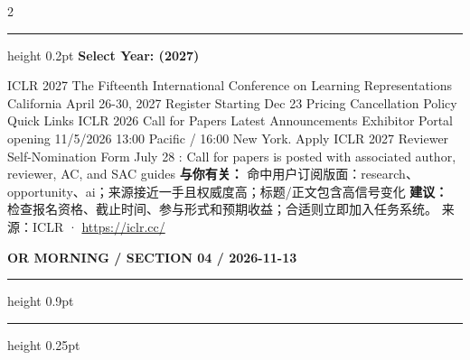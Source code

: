 \documentclass[10.5pt]{ctexart}
\begin{document}
\begin{multicols}{2}
\vspace{2mm}
\hrule height 0.2pt
\vspace{2mm}
{\large\bfseries Select Year: (2027)}\par
ICLR 2027 The Fifteenth International Conference on Learning Representations California April 26-30, 2027 Register Starting Dec 23 Pricing Cancellation Policy Quick Links ICLR 2026 Call for Papers Latest Announcements Exhibitor Portal opening 11/5/2026 13:00 Pacific / 16:00 New York. Apply ICLR 2027 Reviewer Self-Nomination Form July 28 : Call for papers is posted with associated author, reviewer, AC, and SAC guides 
\textbf{与你有关：} 命中用户订阅版面：research、opportunity、ai；来源接近一手且权威度高；标题/正文包含高信号变化
\textbf{建议：} 检查报名资格、截止时间、参与形式和预期收益；合适则立即加入任务系统。
{\footnotesize\color{ormuted} 来源：ICLR · \url{https://iclr.cc/}}
\end{multicols}
\newpage
{\small\bfseries OR MORNING / SECTION 04 / 2026-11-13}
\vspace{2mm}
\hrule height 0.9pt
\vspace{1.5mm}
\hrule height 0.25pt
\vspace{4mm}
\end{document}
